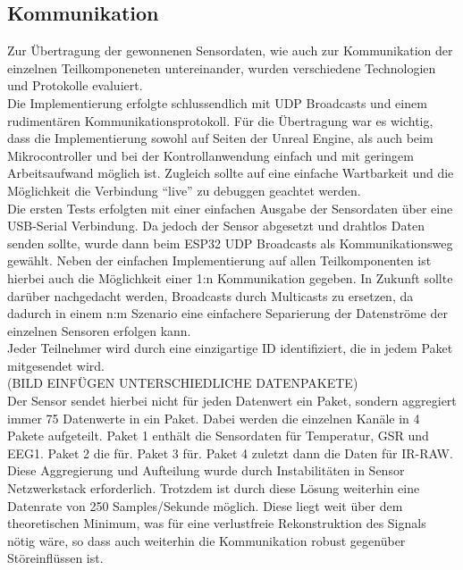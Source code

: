 \subsection{Kommunikation} \label{grund-kommunikation}


Zur Übertragung der gewonnenen Sensordaten, wie auch zur Kommunikation der einzelnen Teilkomponeneten untereinander, wurden verschiedene Technologien und Protokolle evaluiert. \\

Die Implementierung erfolgte schlussendlich mit UDP Broadcasts und einem rudimentären Kommunikationsprotokoll.
Für die Übertragung war es wichtig, dass die Implementierung sowohl auf Seiten der Unreal Engine, als auch beim Mikrocontroller und bei der Kontrollanwendung einfach und mit geringem Arbeitsaufwand möglich ist.
Zugleich sollte auf eine einfache Wartbarkeit und die Möglichkeit die Verbindung ``live'' zu debuggen geachtet werden. \\

Die ersten Tests erfolgten mit einer einfachen Ausgabe der Sensordaten über eine USB-Serial Verbindung.
Da jedoch der Sensor abgesetzt und drahtlos Daten senden sollte, wurde dann beim ESP32 UDP Broadcasts als Kommunikationsweg gewählt. Neben der einfachen Implementierung auf allen Teilkomponenten ist hierbei auch die Möglichkeit einer 1:n Kommunikation gegeben.
In Zukunft sollte darüber nachgedacht werden, Broadcasts durch Multicasts zu ersetzen, da dadurch in einem n:m Szenario eine einfachere Separierung der Datenströme der einzelnen Sensoren erfolgen kann. \\

Jeder Teilnehmer wird durch eine einzigartige ID identifiziert, die in jedem Paket mitgesendet wird. \\

(BILD EINFÜGEN UNTERSCHIEDLICHE DATENPAKETE) \\

Der Sensor sendet hierbei nicht für jeden Datenwert ein Paket, sondern aggregiert immer 75 Datenwerte in ein Paket. Dabei werden die einzelnen Kanäle in 4 Pakete aufgeteilt.
Paket 1 enthält die Sensordaten für Temperatur, GSR und EEG1. 
Paket 2 die für. 
Paket 3 für. 
Paket 4 zuletzt dann die Daten für IR-RAW. Diese Aggregierung und Aufteilung wurde durch Instabilitäten in Sensor Netzwerkstack erforderlich.
Trotzdem ist durch diese Lösung weiterhin eine Datenrate von 250 Samples/Sekunde möglich. Diese liegt weit über dem theoretischen Minimum, was für eine verlustfreie Rekonstruktion des Signals nötig wäre, so dass auch weiterhin die Kommunikation robust gegenüber Störeinflüssen ist.